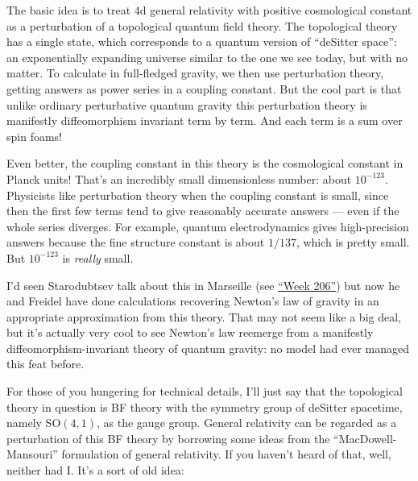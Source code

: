 \documentclass{article}
\renewcommand{\texttt}[1]{%
  \begingroup
  \ttfamily
  \begingroup\lccode`~=`/\lowercase{\endgroup\def~}{/\discretionary{}{}{}}%
  \begingroup\lccode`~=`[\lowercase{\endgroup\def~}{[\discretionary{}{}{}}%
  \begingroup\lccode`~=`.\lowercase{\endgroup\def~}{.\discretionary{}{}{}}%
  \catcode`/=\active\catcode`[=\active\catcode`.=\active
  \scantokens{#1\noexpand}%
  \endgroup
}
\begin{document}

The basic idea is to treat 4d general relativity with positive
cosmological constant as a perturbation of a topological quantum field
theory. The topological theory has a single state, which corresponds to
a quantum version of ``deSitter space'': an exponentially expanding
universe similar to the one we see today, but with no matter. To
calculate in full-fledged gravity, we then use perturbation theory,
getting answers as power series in a coupling constant. But the cool
part is that unlike ordinary perturbative quantum gravity this
perturbation theory is manifestly diffeomorphism invariant term by term.
And each term is a sum over spin foams!

Even better, the coupling constant in this theory is the cosmological
constant in Planck units! That's an incredibly small dimensionless
number: about \(10^{-123}\). Physicists like perturbation theory when
the coupling constant is small, since then the first few terms tend to
give reasonably accurate answers --- even if the whole series diverges.
For example, quantum electrodynamics gives high-precision answers
because the fine structure constant is about \(1/137\), which is pretty
small. But \(10^{-123}\) is \emph{really} small.

I'd seen Starodubtsev talk about this in Marseille (see
\protect\hyperlink{week206}{``Week 206''}) but now he and Freidel have
done calculations recovering Newton's law of gravity in an appropriate
approximation from this theory. That may not seem like a big deal, but
it's actually very cool to see Newton's law reemerge from a manifestly
diffeomorphism-invariant theory of quantum gravity: no model had ever
managed this feat before.

For those of you hungering for technical details, I'll just say that the
topological theory in question is BF theory with the symmetry group of
deSitter spacetime, namely \(\mathrm{SO}(4,1)\), as the gauge group.
General relativity can be regarded as a perturbation of this BF theory
by borrowing some ideas from the ``MacDowell-Mansouri'' formulation of
general relativity. If you haven't heard of that, well, neither had I.
It's a sort of old idea:
\end{document}
